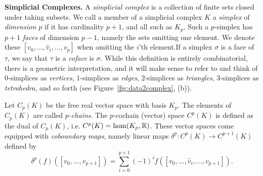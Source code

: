 \textbf{Simplicial Complexes.} A \emph{simplicial complex} is a collection of finite sets closed under taking subsets. We call a member of a simplicial complex $K$ a \emph{simplex} of \emph{dimension $p$} if it has cardinality $p+1$, and all such as $K_p$. Such a $p$-simplex has $p+1$ \emph{faces} of dimension $p-1$, namely the sets omitting one element. We denote these $[v_0,\dotsc,\hat{v}_i,\dotsc, v_p]$ when omitting the $i$'th element.If a simplex $\sigma$ is a face of $\tau$, we say that $\tau$ is a \emph{coface} is $\sigma$. While this definition is entirely combinatorial, there is a geometric interpretation, and it will make sense to refer to and think of $0$-simplices as \emph{vertices}, $1$-simplices as \emph{edges}, $2$-simplices as \emph{triangles}, $3$-simplices as \emph{tetrahedra}, and so forth (see Figure~\ref{fig:data2complex}, (b)).

Let $C_p(K)$ be the free real vector space with basis $K_p$. The elements of $C_p(K)$ are called \emph{$p$-chains}. The $p$-cochain (vector) space $C^p(K)$ is defined as the dual of $C_p(K)$, i.e. $C^p(K)=\hom(K_p,\mathbb{R})$. These vector spaces come equipped with \emph{coboundary maps}, namely linear maps $\delta^p:C^p(K)\to C^{p+1}(K)$ defined by
\begin{equation*}
\delta^p(f)([v_0,\dotsc,v_{p+1}]) = \sum_{i=0}^{p+1} (-1)^i f([v_0,\dotsc,\hat{v}_i,\dotsc,v_{p+1}]).
\end{equation*}

